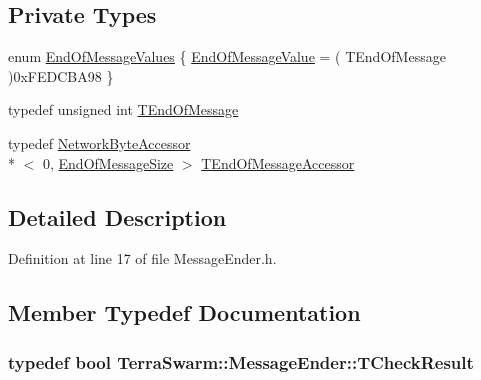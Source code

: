 \subsection*{Private Types}
\begin{DoxyCompactItemize}
\item 
enum \hyperlink{class_terra_swarm_1_1_message_ender_a0ba74240f52a1197820539e30b216b91}{End\-Of\-Message\-Values} \{ \hyperlink{class_terra_swarm_1_1_message_ender_a0ba74240f52a1197820539e30b216b91ac6e6cab219b02e3512687915ec26be5c}{End\-Of\-Message\-Value} = ( T\-End\-Of\-Message )0x\-F\-E\-D\-C\-B\-A98
 \}
\item 
typedef unsigned int \hyperlink{class_terra_swarm_1_1_message_ender_a34ecb0835fc9e09799dd1a30fcf5ff65}{T\-End\-Of\-Message}
\item 
typedef \hyperlink{class_terra_swarm_1_1_network_byte_accessor}{Network\-Byte\-Accessor}\\*
$<$ 0, \hyperlink{class_terra_swarm_1_1_message_ender_a69b4e82c4fb985160b5bbd11c0fc65ffa61b601ee3929906b25d5d72130acc98e}{End\-Of\-Message\-Size} $>$ \hyperlink{class_terra_swarm_1_1_message_ender_aa82232ef2e15f3c918e5d8187dff86f8}{T\-End\-Of\-Message\-Accessor}
\end{DoxyCompactItemize}


\subsection{Detailed Description}


Definition at line 17 of file Message\-Ender.\-h.



\subsection{Member Typedef Documentation}
\hypertarget{class_terra_swarm_1_1_message_ender_a4f3f1bf696190619eb5580c3007ac83a}{
\subsubsection[{T\-Check\-Result}]{\setlength{\rightskip}{0pt plus 5cm}typedef bool {\bf Terra\-Swarm\-::\-Message\-Ender\-::\-T\-Check\-Result}}}\label{class_terra_swarm_1_1_message_ender_a4f3f1bf696190619eb5580c3007ac83a}


